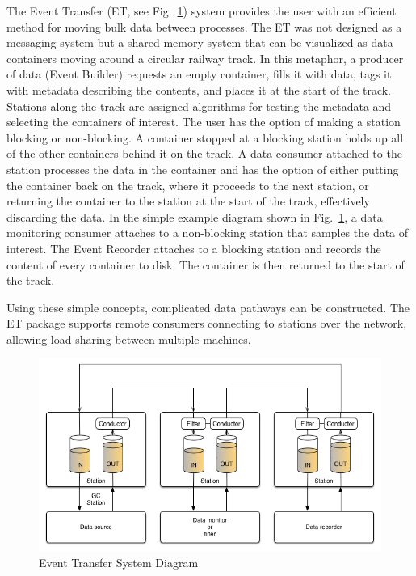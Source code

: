The Event Transfer (ET, see Fig.~\ref{fig:et_diagram}) system provides the user with an efficient method for moving bulk data between processes. The ET was not designed as a messaging system but a shared memory system that can be visualized as data containers moving around a circular railway track. In this metaphor, a producer of data (Event Builder) requests an empty container, fills it with data, tags it with metadata describing the contents, and places it at the start of the track. Stations along the track are assigned algorithms for testing the metadata and selecting the containers of interest. The user has the option of making a station blocking or non-blocking. A container stopped at a blocking station holds up all of the other containers behind it on the track. A data consumer attached to the station processes the data in the container and has the option of either putting the container back on the track, where it proceeds to the next station, or returning the container to the station at the start of the track, effectively discarding the data. In the simple example diagram shown in Fig.~\ref{fig:et_diagram}, a data monitoring consumer attaches to a non-blocking station that samples the data of interest. The Event Recorder attaches to a blocking station and records the content of every container to disk. The container is then returned to the start of the track.

Using these simple concepts, complicated data pathways can be constructed. The ET package supports remote consumers connecting to stations over the network, allowing load sharing between multiple machines. 

\begin{figure}[hbt]
	\centering
	\includegraphics[width=1.0\columnwidth,keepaspectratio]{img/et_diagram.png}
	\caption{Event Transfer System Diagram}
	\label{fig:et_diagram}
\end{figure}

